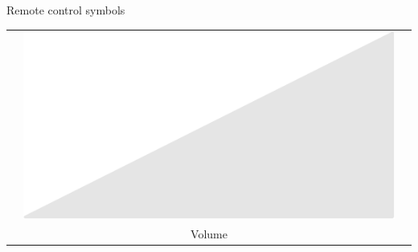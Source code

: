 \documentclass[14pt]{beamer}
\begin{document}
\begin{frame}{Remote control symbols}
\begin{center}
\begin{tabular}{ccc}
                &\quad\includegraphics[scale=0.2]{figures/figure026l.pdf} \quad& \\
                &\quad Volume \quad& \\
            \end{tabular}
        \end{center}
    \end{frame}

\end{document}
